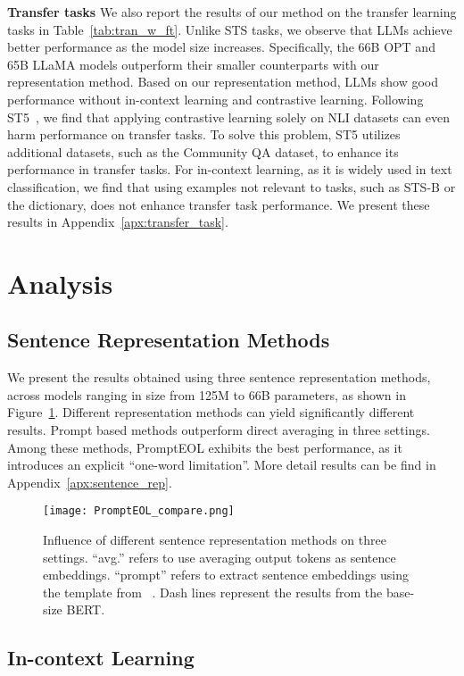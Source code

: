 \documentclass{article}
\begin{document}
\textbf{Transfer tasks}
We also report the results of our method on the transfer learning tasks in Table~\ref{tab:tran_w_ft}.
Unlike STS tasks, we observe that LLMs achieve better performance as the model size increases.
Specifically, the 66B OPT and 65B LLaMA models outperform their smaller counterparts with our representation method.
Based on our representation method, LLMs show good performance without in-context learning and contrastive learning.
Following ST5~\cite{sentencet5}, we find that applying contrastive learning solely on NLI datasets can even harm performance on transfer tasks.
To solve this problem, ST5 utilizes additional datasets, such as the Community QA dataset, to enhance its performance in transfer tasks.
For in-context learning, as it is widely used in text classification,
we find that using examples not relevant to tasks, such as STS-B or the dictionary, does not enhance transfer task performance.
We present these results in Appendix~\ref{apx:transfer_task}.



\section{Analysis}
\subsection{Sentence Representation Methods}
We present the results obtained using three sentence representation methods, across models ranging in size from 125M to 66B parameters, as shown in Figure~\ref{fig:PromptEOL_rep}. Different representation methods can yield significantly different results.
Prompt based methods outperform direct averaging in three settings.
Among these methods, PromptEOL exhibits the best performance, as it introduces an explicit ``one-word limitation''.
More detail results can be find in Appendix~\ref{apx:sentence_rep}.

\begin{figure}[h]
\centering
\texttt{[image: PromptEOL\_compare.png]}
\caption{
  Influence of different sentence representation methods on three settings.
  ``avg.'' refers to use averaging output tokens as sentence embeddings.
  ``prompt'' refers to extract sentence embeddings using the template from~\cite{jiang2022promptbert} .
  Dash lines represent the results from the base-size BERT.
}
\label{fig:PromptEOL_rep}
\end{figure}

\subsection{In-context Learning}
\end{document}
